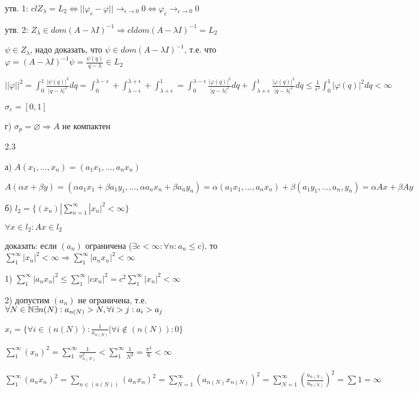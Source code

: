 \documentclass[russian]{article}
\begin{document}
утв. 1: $cl Z_\lambda = L_2 \Leftrightarrow ||\varphi_\epsilon - \varphi || \rightarrow _ {\epsilon \rightarrow 0} 0 \Leftrightarrow \varphi_ \epsilon \rightarrow _{\epsilon \rightarrow 0} 0$

утв. 2: $Z_\lambda \in dom(A-\lambda I)^{-1} \Rightarrow cl dom (A-\lambda I)^{-1} = L_2$

$\psi \in Z_\lambda$, надо доказать, что $\psi \in dom (A-\lambda I)^{-1}$, т.е. что $\varphi = (A-\lambda I)^{-1}\psi=\frac{\psi(q)}{q-\lambda} \in L_2$

$||\varphi||^2 = \int_0^1\frac{|\psi(q)|^2}{|q-\lambda|^2}dq = \int_0^{\lambda - \epsilon} + \int_{\lambda - \epsilon}^{\lambda + \epsilon} + \int_{\lambda + \epsilon}^1=\int_0^{\lambda - \epsilon}\frac{|\varphi(q)|^2}{|q-\lambda|^2}dq+\int_{\lambda + \epsilon}^1\frac{|\varphi(q)|^2}{|q-\lambda|^2}dq\le\frac{1}{\epsilon^2}\int_0^1|\varphi(q)|^2dq<\infty$

$\sigma_c = [0,1]$

г) $\sigma_p = \varnothing \Rightarrow A$ не компактен

2.3

а) $A(x_1, ..., x_n) = (a_1 x_1, ..., a_n x_n)$

$A(\alpha x + \beta y) = (\alpha a_1 x_1 + \beta a_1 y_1, ..., \alpha a_n x_n + \beta a_n y_n) = \alpha (a_1 x_1, ..., a_n x_n) + \beta (a_1 y_1, ..., a_n, y_n) = \alpha A x + \beta A y$

б) $l_2 = \{ (x_n) | \sum_{n=1}^{\infty}|x_n|^2<\infty \}$

$\forall x \in l_2 : Ax \in l_2 $

доказать: если $(a_n)$ ограничена ($\exists c < \infty : \forall n : a_n \le c $), то $\sum_1^\infty |x_n|^2 < \infty \Rightarrow \sum_1^\infty  |a_n x_n| ^2 < \infty$

1) $ \sum_1^\infty  |a_n x_n| ^2 \le \sum_1^\infty  |c x_n| ^2 = c^2 \sum_1^\infty |x_n| ^2 < \infty$

2) допустим $(a_n)$ не ограничена, т.е. $\forall N \in \Bbb N \exists n(N) : a_{n(N)} > N, \forall i>j : a_i>a_j $

$x_i = \{ \forall i \in (n(N)) : \frac{1}{a_{n(N)}} | \forall i \notin (n(N)) : 0 \}$

$ \sum _1^\infty (x_n)^2 = \sum _1^\infty \frac{1}{a_{n(N)}^2} < \sum _1^\infty \frac{1}{N^2} = \frac{\pi^2}{6} < \infty $

$ \sum _1^\infty (a_n x_n)^2 = \sum _{n\in(n(N))} (a_n x_n)^2 = \sum _{N=1}^\infty (a_{n(N)} x_{n(N)})^2 = \sum _{N=1}^\infty (\frac{a_{n(N)}}{a_{n(N)}})^2 = \sum 1 = \infty $
\end{document}
